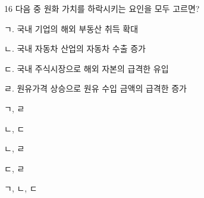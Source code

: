 \begin{question}{16}
다음 중 원화 가치를 하락시키는 요인을 모두 고르면?
\begin{framedtext}
ㄱ. 국내 기업의 해외 부동산 취득 확대 \par
ㄴ. 국내 자동차 산업의 자동차 수출 증가 \par
ㄷ. 국내 주식시장으로 해외 자본의 급격한 유입 \par
ㄹ. 원유가격 상승으로 원유 수입 금액의 급격한 증가 \par
\end{framedtext}
\begin{choices}
  \item ㄱ, ㄹ
  \item ㄴ, ㄷ
  \item ㄴ, ㄹ
  \item ㄷ, ㄹ
  \item ㄱ, ㄴ, ㄷ
\end{choices}
\end{question}
